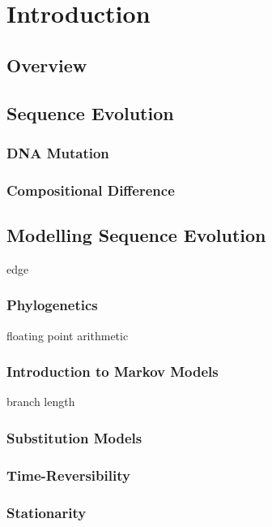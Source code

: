 \chapter{Introduction}

\section{Overview}

\section{Sequence Evolution}

\subsection{DNA Mutation}

\subsection{Compositional Difference}

\section{Modelling Sequence Evolution}

\gls{edge}

\subsection{Phylogenetics}

\gls{floating point arithmetic}

\subsection{Introduction to Markov Models}

\gls{branch length}

\subsection{Substitution Models}

\subsection{Time-Reversibility}

\subsection{Stationarity}

